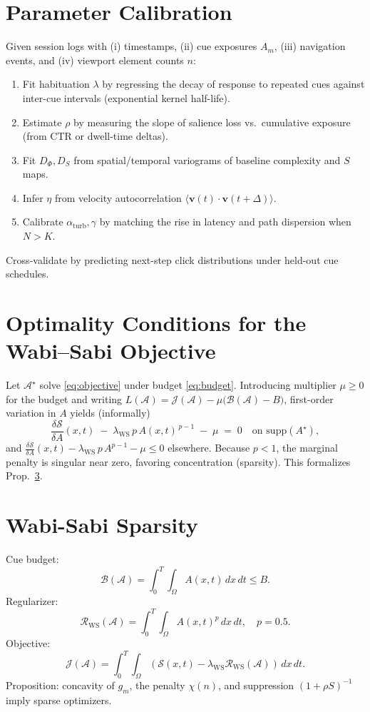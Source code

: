 \documentclass[openany]{book}
\begin{document}
\section{Parameter Calibration}
\label{sec:rsvp-calibration}
Given session logs with (i) timestamps, (ii) cue exposures $A_m$, (iii) navigation events, and (iv) viewport element counts $n$:
\begin{enumerate}[leftmargin=*,itemsep=2pt]
\item Fit habituation $\lambda$ by regressing the decay of response to repeated cues against inter-cue intervals (exponential kernel half-life).
\item Estimate $\rho$ by measuring the slope of salience loss vs.\ cumulative exposure (from CTR or dwell-time deltas).
\item Fit $D_\Phi,D_S$ from spatial/temporal variograms of baseline complexity and $S$ maps.
\item Infer $\eta$ from velocity autocorrelation $\langle \mathbf v(t)\cdot \mathbf v(t+\Delta)\rangle$.
\item Calibrate $\alpha_{\mathrm{turb}},\gamma$ by matching the rise in latency and path dispersion when $N>K$.
\end{enumerate}
Cross-validate by predicting next-step click distributions under held-out cue schedules.

\section{Optimality Conditions for the Wabi–Sabi Objective}
\label{sec:rsvp-kkt}
Let $\mathcal{A}^\star$ solve \eqref{eq:objective} under budget \eqref{eq:budget}. Introducing multiplier $\mu\ge 0$ for the budget and writing $L(\mathcal{A})=\mathcal{J}(\mathcal{A})-\mu\big(\mathcal{B}(\mathcal{A})-B\big)$, first-order variation in $A$ yields (informally)
\begin{equation}
\frac{\delta \mathcal{S}}{\delta A}(x,t)\;-\;\lambda_{\mathrm{WS}}\,p\,A(x,t)^{\,p-1}\;-\;\mu \;=\;0 \quad\text{on }\mathrm{supp}(A^\star),
\end{equation}
and $\frac{\delta \mathcal{S}}{\delta A}(x,t)-\lambda_{\mathrm{WS}}\,p\,A^{p-1}-\mu \le 0$ elsewhere. Because $p\!<\!1$, the marginal penalty is singular near zero, favoring concentration (sparsity). This formalizes Prop.~\ref{sec:rsvp-wabisabi}.

\section{Wabi-Sabi Sparsity}
\label{sec:rsvp-wabisabi}
Cue budget:
\[
\mathcal{B}(\mathcal{A})=\int_0^T \int_\Omega A(x,t)\,dx\,dt \leq B.
\]
Regularizer:
\[
\mathcal{R}_{\mathrm{WS}}(\mathcal{A}) = \int_0^T \int_\Omega A(x,t)^p\, dx\,dt, \quad p=0.5.
\]
Objective:
\[
\mathcal{J}(\mathcal{A}) = \int_0^T \int_\Omega \left(\mathcal{S}(x,t) - \lambda_{\mathrm{WS}} \mathcal{R}_{\mathrm{WS}}(\mathcal{A})\right)\, dx\,dt.
\]
Proposition: concavity of $g_m$, the penalty $\chi(n)$, and suppression $(1+\rho S)^{-1}$ imply sparse optimizers.
\end{document}
